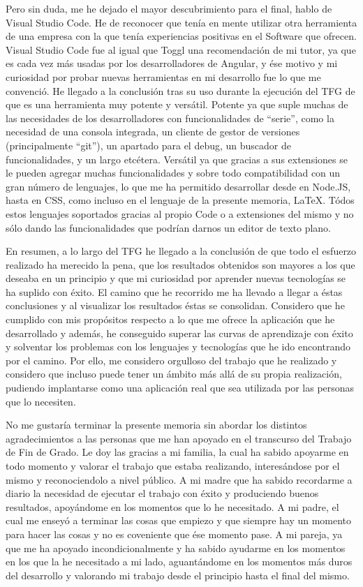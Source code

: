 \documentclass[11pt,openany]{book}
\begin{document}
Pero sin duda, me he dejado el mayor descubrimiento para el final, hablo de Visual Studio Code. He de reconocer que tenía en mente utilizar otra herramienta de una empresa con la que tenía experiencias positivas en el Software que ofrecen. Visual Studio Code fue al igual que Toggl una recomendación de mi tutor, ya que es cada vez más usadas por los desarrolladores de Angular, y ése motivo y mi curiosidad por probar nuevas herramientas en mi desarrollo fue lo que me convenció. He llegado a la conclusión tras su uso durante la ejecución del TFG de que es una herramienta muy potente y versátil. Potente ya que suple muchas de las necesidades de los desarrolladores con funcionalidades de ``serie'', como la necesidad de una consola integrada, un cliente de gestor de versiones (principalmente ``git''), un apartado para el debug, un buscador de funcionalidades, y un largo etcétera. Versátil ya que gracias a sus extensiones se le pueden agregar muchas funcionalidades y sobre todo compatibilidad con un gran número de lenguajes, lo que me ha permitido desarrollar desde en Node.JS, hasta en CSS, como incluso en el lenguaje de la presente memoria, LaTeX. Tódos estos lenguajes soportados gracias al propio Code o a extensiones del mismo y no sólo dando las funcionalidades que podrían darnos un editor de texto plano.

En resumen, a lo largo del TFG he llegado a la conclusión de que todo el esfuerzo realizado ha merecido la pena, que los resultados obtenidos son mayores a los que deseaba en un principio y que mi curiosidad por aprender nuevas tecnologías se ha suplido con éxito. El camino que he recorrido me ha llevado a llegar a éstas conclusiones y al visualizar los resultados éstas se consolidan. Considero que he cumplido con mis propósitos respecto a lo que me ofrece la aplicación que he desarrollado y además, he conseguido superar las curvas de aprendizaje con éxito y solventar los problemas con los lenguajes y tecnologías que he ido encontrando por el camino. Por ello, me considero orgulloso del trabajo que he realizado y considero que incluso puede tener un ámbito más allá de su propia realización, pudiendo implantarse como una aplicación real que sea utilizada por las personas que lo necesiten.

No me gustaría terminar la presente memoria sin abordar los distintos agradecimientos a las personas que me han apoyado en el transcurso del Trabajo de Fin de Grado. Le doy las gracias a mi familia, la cual ha sabido apoyarme en todo momento y valorar el trabajo que estaba realizando, interesándose por el mismo y reconociendolo a nivel público. A mi madre que ha sabido recordarme a diario la necesidad de ejecutar el trabajo con éxito y produciendo buenos resultados, apoyándome en los momentos que lo he necesitado. A mi padre, el cual me enseyó a terminar las cosas que empiezo y que siempre hay un momento para hacer las cosas y no es coveniente que ése momento pase. A mi pareja, ya que me ha apoyado incondicionalmente y ha sabido ayudarme en los momentos en los que la he necesitado a mi lado, aguantándome en los momentos más duros del desarrollo y valorando mi trabajo desde el principio hasta el final del mismo. 
\end{document}
